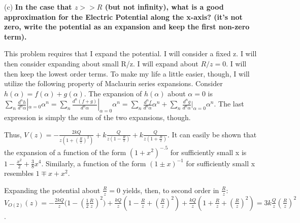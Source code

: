 \begin{homeworkProblem}
\begin{homeworkSection}{(c)}
\textbf{In the case that $z>>R$ (but not infinity), what is a good approximation for the Electric 
Potential along the x-axis? (it's not zero, write the potential as an expansion and keep 
the first non-zero term).}
\\ \par
This problem requires that I expand the potential. I will consider a fixed z. I will then consider expanding about small R/z. I will expand about $R/z = 0$. I will then keep the lowest order terms. To make my life a little easier, though, I will utilize the following property of Maclaurin series expansions. Consider $h(\alpha) = f(\alpha) + g(\alpha)$. The expansion of $h(\alpha)$ about $\alpha = 0$ is $\sum_n \frac{d^n h}{d^n \alpha}|_{\alpha = 0} \alpha^n = \sum_n \frac{d^n (f+g)}{d^n \alpha}|_{\alpha = 0} \alpha^n = \sum_n \frac{d^n f}{d^n \alpha} \alpha^n + \sum_n \frac{d^n g}{d^n \alpha}|_{\alpha = 0} \alpha^n$. The last expression is simply the sum of the two expansions, though.
\\ \par
Thus, $V(z) = -\frac{2kQ}{z(1+(\frac{R}{z})^2)} + k \frac{Q}{z(1-\frac{R}{z})} + k\frac{Q}{z(1+\frac{R}{z})}$. It can easily be shown that the expansion of a function of the form $(1+x^2)^{-.5}$ for sufficiently small x is $1-\frac{x^2}{2}+\frac{3}{8}x^4$. Similarly, a function of the form $(1 \pm x)^{-1}$ for sufficiently small x resembles $1 \mp x + x^2$.
\\ \par
Expanding the potential about $\frac{R}{z} = 0$ yields, then, to second order in $\frac{R}{z}$: $V_{O(2)}(z) = -\frac{2kQ}{z}\big(1-(\frac{1}{2}\frac{R}{z})^2\big)+\frac{kQ}{z}(1-\frac{R}{z}+(\frac{R}{z})^2)+\frac{kQ}{z}(1+\frac{R}{z}+(\frac{R}{z})^2)=3k\frac{Q}{z}(\frac{R}{z})^2$.

\end{homeworkSection}

\end{homeworkProblem}